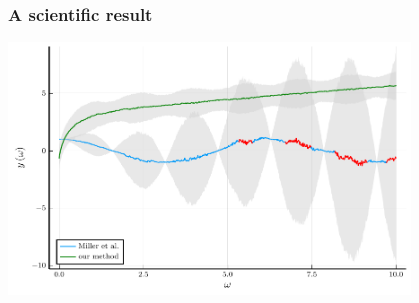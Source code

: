\documentclass[aspectratio=169]{beamer}
\begin{document}
\begin{frame} %
  \frametitle{A scientific result}
    \centering
    \includegraphics[width=0.8\textwidth]{./PlotSources/std4.pdf}
\end{frame}
\end{document}
